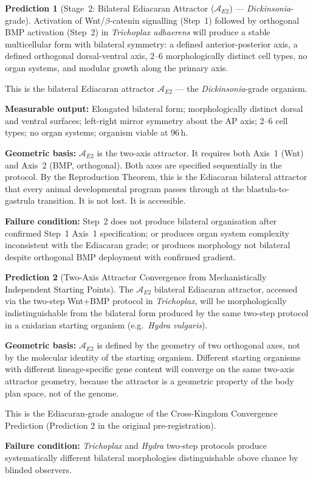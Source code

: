 \documentclass[12pt, a4paper]{article}
\theoremstyle{definition}
\newtheorem{prediction}{Prediction}[section]
\theoremstyle{remark}
\begin{document}
\begin{prediction}[Stage~2: Bilateral Ediacaran Attractor
($\mathcal{A}_{E2}$) ---
\textit{Dickinsonia}-grade]
\label{pred:e2}
Activation of Wnt/$\beta$-catenin signalling (Step~1)
followed by orthogonal BMP activation (Step~2) in
\textit{Trichoplax adhaerens} will produce a stable
multicellular form with bilateral symmetry: a defined
anterior-posterior axis, a defined orthogonal
dorsal-ventral axis, 2--6 morphologically distinct cell
types, no organ systems, and modular growth along the
primary axis.

This is the bilateral Ediacaran attractor $\mathcal{A}_{E2}$
--- the \textit{Dickinsonia}-grade organism.

\textbf{Measurable output:} Elongated bilateral form;
morphologically distinct dorsal and ventral surfaces;
left-right mirror symmetry about the AP axis; 2--6
cell types; no organ systems; organism viable at 96\,h.

\textbf{Geometric basis:} $\mathcal{A}_{E2}$ is the
two-axis attractor. It requires both Axis~1 (Wnt) and
Axis~2 (BMP, orthogonal). Both axes are specified
sequentially in the protocol. By the Reproduction Theorem,
this is the Ediacaran bilateral attractor that every
animal developmental program passes through at the
blastula-to-gastrula transition. It is not lost.
It is accessible.

\textbf{Failure condition:} Step~2 does not produce
bilateral organisation after confirmed Step~1 Axis~1
specification; or produces organ system complexity
inconsistent with the Ediacaran grade; or produces
morphology not bilateral despite orthogonal BMP
deployment with confirmed gradient.
\end{prediction}

\begin{prediction}[Two-Axis Attractor Convergence from
Mechanistically Independent Starting Points]
\label{pred:convergence}
The $\mathcal{A}_{E2}$ bilateral Ediacaran attractor,
accessed via the two-step Wnt+BMP protocol in
\textit{Trichoplax}, will be morphologically
indistinguishable from the bilateral form produced by
the same two-step protocol in a cnidarian starting
organism (e.g.\ \textit{Hydra vulgaris}).

\textbf{Geometric basis:} $\mathcal{A}_{E2}$ is defined
by the geometry of two orthogonal axes, not by the
molecular identity of the starting organism. Different
starting organisms with different lineage-specific gene
content will converge on the same two-axis attractor
geometry, because the attractor is a geometric property
of the body plan space, not of the genome.

This is the Ediacaran-grade analogue of the Cross-Kingdom
Convergence Prediction (Prediction 2 in the original
pre-registration).

\textbf{Failure condition:} \textit{Trichoplax} and
\textit{Hydra} two-step protocols produce systematically
different bilateral morphologies distinguishable above
chance by blinded observers.
\end{prediction}
\end{document}
